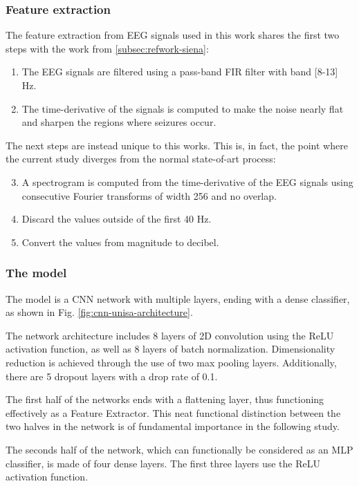 \subsubsection{Feature extraction} \label{subsub:refwork-unisa-featext}
The feature extraction from \gls{EEG} signals used in this work shares the first two steps with the work from \ref{subsec:refwork-siena}:
\begin{enumerate}
    \item The EEG signals are filtered using a pass-band FIR filter with band [8-13] \unit{Hz}.
    \item The time-derivative of the signals is computed to make the noise nearly flat and sharpen the regions where seizures occur.
\end{enumerate}

The next steps are instead unique to this works. This is, in fact, the point where the current study diverges from the normal state-of-art process:
\begin{enumerate}
    \setcounter{enumi}{2}
    \item A spectrogram is computed from the time-derivative of the \gls{EEG} signals using consecutive Fourier transforms of width 256 and no overlap.
    \item Discard the values outside of the first 40 Hz.
    \item Convert the values from magnitude to decibel.
\end{enumerate}

\subsubsection{The model}
The model is a \gls{CNN} network with multiple layers, ending with a dense classifier, as shown in Fig. \ref{fig:cnn-unisa-architecture}.

The network architecture includes 8 layers of 2D convolution using the \gls{ReLU} activation function, as well as 8 layers of batch normalization. Dimensionality reduction is achieved through the use of two max pooling layers. Additionally, there are 5 dropout layers with a drop rate of 0.1. 

The first half of the networks ends with a flattening layer, thus functioning effectively as a Feature Extractor. This neat functional distinction between the two halves in the network is of fundamental importance in the following study.

The seconds half of the network, which can functionally be considered as an \gls{MLP} classifier, is made of four dense layers. The first three layers use the \gls{ReLU} activation function. 

